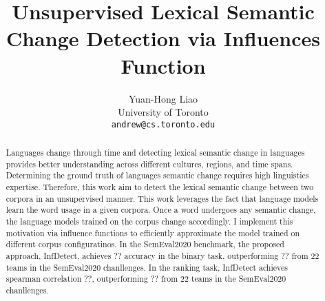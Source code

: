 \documentclass[11pt]{article}
\title{Unsupervised Lexical Semantic Change Detection via Influences Function}
\author{
  Yuan-Hong Liao \\
  University of Toronto \\
  \texttt{andrew@cs.toronto.edu}}
\begin{document}
\maketitle
\begin{abstract}
  Languages change through time and detecting lexical semantic change in languages provides better understanding across different cultures, regions, and time spans.
  Determining the ground truth of languages semantic change requires high linguistics expertise. 
  Therefore, this work aim to detect the lexical semantic change between two corpora in an unsupervised manner.
  This work leverages the fact that language models learn the word usage in a given corpora. 
  Once a word undergoes any semantic change, the language models trained on the corpus change accordingly.
  I implement this motivation via influence functions to efficiently approximate the model trained on different corpus configuratinos.
  In the SemEval2020 benchmark, the proposed approach, InfDetect, achieves ?? accuracy in the binary task, outperforming ?? from 22 teams in the SemEval2020 chanllenges.
  In the ranking task, InfDetect achieves spearman correlation ??, outperforming ?? from 22 teams in the SemEval2020 chanllenges.
\end{abstract}











\end{document}
